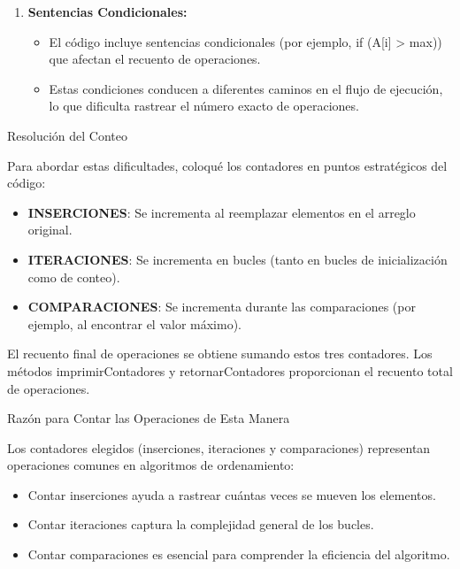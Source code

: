 \documentclass[12pt]{article}
\begin{document}
\begin{enumerate}
    \item \textbf{Sentencias Condicionales:}
          \begin{itemize}
              \item El código incluye sentencias condicionales (por ejemplo, if (A[i] > max)) que afectan el recuento de operaciones.
              \item Estas condiciones conducen a diferentes caminos en el flujo de ejecución, lo que dificulta rastrear el número exacto de operaciones.
          \end{itemize}
\end{enumerate}
\par\vspace{0.4cm}
Resolución del Conteo
\par\vspace{0.4cm}
Para abordar estas dificultades, coloqué los contadores en puntos estratégicos del código:
\par\vspace{0.4cm}
\begin{itemize}
    \item \textbf{INSERCIONES}: Se incrementa al reemplazar elementos en el arreglo original.
    \item \textbf{ITERACIONES}: Se incrementa en bucles (tanto en bucles de inicialización como de conteo).
    \item \textbf{COMPARACIONES}: Se incrementa durante las comparaciones (por ejemplo, al encontrar el valor máximo).
\end{itemize}
\par\vspace{0.4cm}
El recuento final de operaciones se obtiene sumando estos tres contadores. Los métodos imprimirContadores y retornarContadores proporcionan el recuento total de operaciones.
\par\vspace{0.4cm}
Razón para Contar las Operaciones de Esta Manera
\par\vspace{0.4cm}
Los contadores elegidos (inserciones, iteraciones y comparaciones) representan operaciones comunes en algoritmos de ordenamiento:
\par\vspace{0.4cm}
\begin{itemize}
    \item Contar inserciones ayuda a rastrear cuántas veces se mueven los elementos.
    \item Contar iteraciones captura la complejidad general de los bucles.
    \item Contar comparaciones es esencial para comprender la eficiencia del algoritmo.
\end{itemize}
\end{document}
